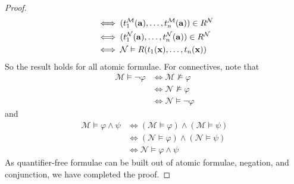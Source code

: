 \begin{proof}
\begin{align*}
        &\iff (t_1^{\mathcal M}(\vb a), \dots, t_n^{\mathcal M}(\vb a)) \in R^{\mathcal N} \\
        &\iff (t_1^{\mathcal N}(\vb a), \dots, t_n^{\mathcal N}(\vb a)) \in R^{\mathcal N} \\
        &\iff \mathcal N \vDash R(t_1(\vb x), \dots, t_n(\vb x))
    \end{align*}
    So the result holds for all atomic formulae.
    For connectives, note that
    \begin{align*}
        \mathcal M \vDash \neg \varphi &\iff \mathcal M \nvDash \varphi \\
        &\iff \mathcal N \nvDash \varphi \\
        &\iff \mathcal N \vDash \neg \varphi
    \end{align*}
    and
    \begin{align*}
        \mathcal M \vDash \varphi \wedge \psi &\iff (\mathcal M \vDash \varphi) \wedge (\mathcal M \vDash \psi) \\
        &\iff (\mathcal N \vDash \varphi) \wedge (\mathcal N \vDash \psi) \\
        &\iff \mathcal N \vDash \varphi \wedge \psi
    \end{align*}
    As quantifier-free formulae can be built out of atomic formulae, negation, and conjunction, we have completed the proof.
\end{proof}

